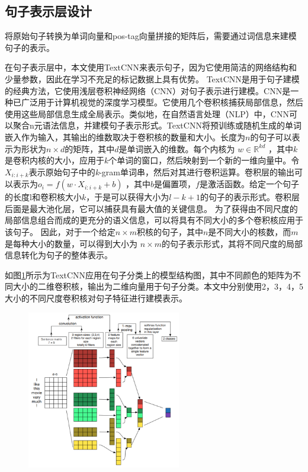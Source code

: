 \subsection{句子表示层设计}
将原始句子转换为单词向量和pos-tag向量拼接的矩阵后，需要通过词信息来建模句子的表示。

在句子表示层中，本文使用TextCNN\cite{kim2014convolutional}来表示句子，因为它使用简洁的网络结构和少量参数，因此在学习不充足的标记数据上具有优势。
TextCNN是用于句子建模的经典方法，它使用浅层卷积神经网络（CNN）\cite{krizhevsky2012imagenet}对句子表示进行建模。CNN是一种已广泛用于计算机视觉的深度学习模型。它使用几个卷积核捕获局部信息，然后使用这些局部信息生成全局表示。类似地，在自然语言处理（NLP）中，CNN可以聚合n元语法信息，并建模句子表示形式。TextCNN将预训练或随机生成的单词嵌入作为输入，其输出的维数取决于卷积核的数量和大小。长度为$n$的句子可以表示为形状为$n\times d$的矩阵，其中$d$是单词嵌入的维数。每个内核为 $w \in \mathbb{R}^{kd}$ ，其中$k$是卷积内核的大小，应用于$k$个单词的窗口，然后映射到一个新的一维向量中。令$X_{i:i+k}$表示原始句子中的\textit{k}-gram单词串，然后对其进行卷积运算。卷积层的输出可以表示为$o_i=f(w\cdot X_{i:i+k} + b)$ ，其中$b$是偏置项，$f$是激活函数。给定一个句子的长度l和卷积核大小$k$，于是可以获得大小为$l-k+1$的句子的表示形式。卷积层后面是最大池化层，它可以捕获具有最大值的关键信息。
为了获得由不同尺度的局部信息组合而成的更充分的语义信息，可以将具有不同大小的多个卷积核应用于该句子。 因此，对于一个给定$n \times m$积核的句子，其中$n$是不同大小的核数，而$m$是每种大小的数量，可以得到大小为 $n\times m$的句子表示形式，其将不同尺度的局部信息转化为句子的整体表示。

如图\ref{fig:textcnn}所示为TextCNN应用在句子分类上的模型结构图，其中不同颜色的矩阵为不同大小的二维卷积核，输出为二维向量用于句子分类。本文中分别使用2，3，4，5大小的不同尺度卷积核对句子特征进行建模表示。
\begin{figure}[htb]
    \centering
    \includegraphics[width=0.6\textwidth]{Img/textcnn.png}
    \label{fig:textcnn}
\end{figure}

